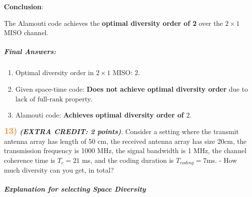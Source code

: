 \documentclass[11pt]{article}
\providecommand{\tightlist}{%
      \setlength{\itemsep}{0pt}\setlength{\parskip}{0pt}}
\begin{document}
\textbf{Conclusion}:

The Alamouti code achieves the \textbf{optimal diversity order of 2}
over the \(2 \times 1\) MISO channel.

\subparagraph{\texorpdfstring{\textbf{Final
Answers}:}{Final Answers:}}\label{final-answers}

\begin{enumerate}
\def\labelenumi{\arabic{enumi}.}
\tightlist
\item
  Optimal diversity order in \(2 \times 1\) MISO: \(\boxed{2}\).
\item
  Given space-time code: \textbf{Does not achieve optimal diversity
  order} due to \(\boxed{\text{lack of full-rank}}\) property.
\item
  Alamouti code: \textbf{Achieves optimal diversity order of
  \(\boxed{2}\)}.
\end{enumerate}

    \(\color{orange}\large\textbf{13)}\) \textbf{\emph{(EXTRA CREDIT: 2
points)}}. Consider a setting where the transmit antenna array has
length of 50 cm, the received antenna array has size 20cm, the
transmission frequency is 1000 MHz, the signal bandwidth is 1 MHz, the
channel coherence time is \(T_c = 21\) ms, and the coding duration is
\(T_{coding} = 7\)ms. - How much diversity can you get, in total?

    \subparagraph{\texorpdfstring{\textbf{Explanation for selecting Space
Diversity}}{Explanation for selecting Space Diversity}}\label{explanation-for-selecting-space-diversity}
\end{document}
